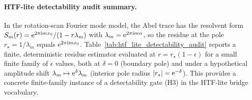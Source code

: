 \paragraph{HTF-lite detectability audit summary.} \AuditTag In the rotation-scan Fourier mode model, the Abel trace has the resolvent form $S_m(r)=\mathrm{e}^{2\pi\mathrm{i} m x_0}/(1-r\lambda_m)$ with $\lambda_m=\mathrm{e}^{2\pi\mathrm{i} m\alpha}$, so the residue at the pole $r_\star=1/\lambda_m$ equals $\mathrm{e}^{2\pi\mathrm{i} m x_0}$. Table~\ref{tab:htf_lite_detectability_audit} reports a finite, deterministic residue estimator evaluated at $r=r_\star(1-\epsilon)$ for a small finite family of $\epsilon$ values, both at $\delta=0$ (boundary pole) and under a hypothetical amplitude shift $\lambda_m\mapsto \mathrm{e}^\delta\lambda_m$ (interior pole radius $|r_\star|=\mathrm{e}^{-\delta}$). This provides a concrete finite-family instance of a detectability gate (H3) in the HTF-lite bridge vocabulary.